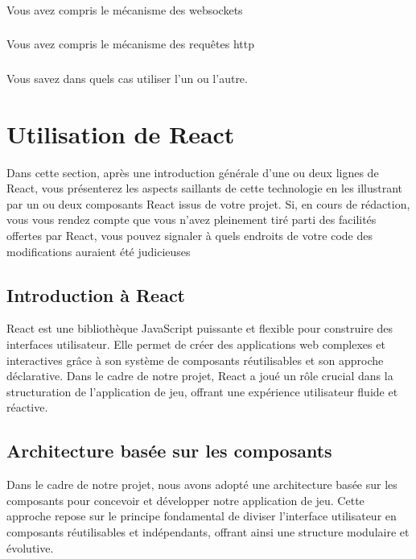 \documentclass[a4paper]{article}
\begin{document}
\subsubsection{} Vous avez compris le mécanisme des websockets
\subsubsection{} Vous avez compris le mécanisme des requêtes http
\subsubsection{} Vous savez dans quels cas utiliser l’un ou l’autre.

\section{Utilisation de React}

Dans cette section, après une  introduction générale d’une ou deux lignes de React, vous présenterez les aspects saillants de cette technologie en les illustrant par un ou deux composants React issus de votre projet. Si, en cours de rédaction, vous vous rendez compte que vous n’avez pleinement tiré parti des facilités offertes par React, vous pouvez signaler à quels endroits de votre code des 
modifications auraient été judicieuses

\subsection{Introduction à React}
React est une bibliothèque JavaScript puissante et flexible pour construire des interfaces utilisateur. Elle permet de créer des applications web complexes et interactives grâce à son système de composants réutilisables et son approche déclarative. Dans le cadre de notre projet, React a joué un rôle crucial dans la structuration de l'application de jeu, offrant une expérience utilisateur fluide et réactive.

\subsection{Architecture basée sur les composants}

Dans le cadre de notre projet, nous avons adopté une architecture basée sur les composants pour concevoir et développer notre application de jeu. Cette approche repose sur le principe fondamental de diviser l'interface utilisateur en composants réutilisables et indépendants, offrant ainsi une structure modulaire et évolutive.
\end{document}
